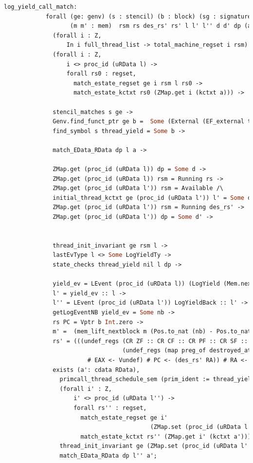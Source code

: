\begin{lstlisting}[language=Caml]     
          log_yield_call_match:
            forall (ge: genv) (s : stencil) (b : block) (sg : signature) 
                   (m m' : mem)  rsm rs des_rs' rs' l l' l'' d d' dp (a: cdata RData) nb yield_ev,
              (forall i : Z,
                  In i full_thread_list -> total_machine_regset i rsm) ->
              (forall i : Z,
                  i <> proc_id (uRData l) ->
                  forall rs0 : regset,
                    match_estate_regset ge i rsm l rs0 ->
                    match_estate_kctxt rs0 (ZMap.get i (kctxt a))) ->

              stencil_matches s ge ->
              Genv.find_funct_ptr ge b =  Some (External (EF_external thread_yield sg)) ->
              find_symbol s thread_yield = Some b ->
              
              match_EData_RData dp l a ->
              
              ZMap.get (proc_id (uRData l)) dp = Some d ->
              ZMap.get (proc_id (uRData l)) rsm = Running rs ->
              ZMap.get (proc_id (uRData l')) rsm = Available /\
              initial_thread_kctxt ge (proc_id (uRData l')) l' = Some des_rs' \/
              ZMap.get (proc_id (uRData l')) rsm = Running des_rs' ->
              ZMap.get (proc_id (uRData l')) dp = Some d' ->


              thread_init_invariant ge rsm l ->
              lastEvType l <> Some LogYieldTy ->
              state_checks thread_yield nil l dp ->

              yield_ev = LEvent (proc_id (uRData l)) (LogYield (Mem.nextblock m)) ->
              l' = yield_ev :: l ->
              l'' = LEvent (proc_id (uRData l')) LogYieldBack :: l' ->
              getLogEventNB yield_ev = Some nb ->
              rs PC = Vptr b Int.zero ->
              m' =  (mem_lift_nextblock m (Pos.to_nat (nb) - Pos.to_nat (Mem.nextblock m) % nat)) ->
              rs' = (((undef_regs (CR ZF :: CR CF :: CR PF :: CR SF :: CR OF :: nil)
                                  (undef_regs (map preg_of destroyed_at_call) des_rs'))
                        # EAX <- Vundef) # PC <- (des_rs' RA)) # RA <- Vundef ->
              exists (a': cdata RData),
                primcall_thread_schedule_sem (prim_ident := thread_yield) big_thread_yield_spec s rs (m, a) rs' (m', a') /\
                (forall i' : Z,
                    i' <> proc_id (uRData l'') ->
                    forall rs'' : regset,
                      match_estate_regset ge i'
                                          (ZMap.set (proc_id (uRData l'')) (Running rs') rsm) l'' rs'' ->
                      match_estate_kctxt rs'' (ZMap.get i' (kctxt a'))) /\
                thread_init_invariant ge (ZMap.set (proc_id (uRData l'')) (Running rs') rsm) l'' /\
                match_EData_RData dp l'' a';
\end{lstlisting}
         
